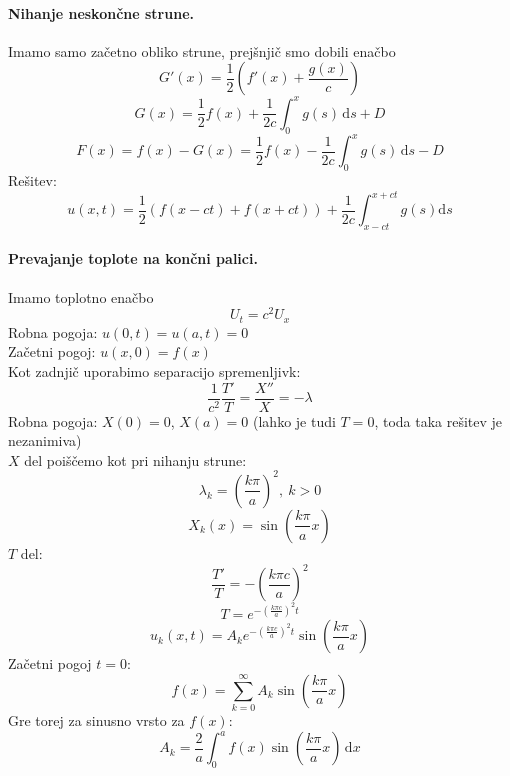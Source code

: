 \documentclass[a4paper]{article}
\newcommand{\dif}{\mathrm{d}}
\newcommand{\Sum}[2][0]{\sum_{{#2} = {#1}}^{\infty}}
\begin{document}
\paragraph{Nihanje neskončne strune.} Imamo samo začetno obliko strune, prejšnjič smo dobili enačbo
$$G'(x) = \frac{1}{2}(f'(x) + \frac{g(x)}{c})$$
$$G(x) = \frac{1}{2}f(x) + \frac{1}{2c} \int_{0}^{x}g(s)\,\dif s + D$$
$$F(x) = f(x) - G(x) = \frac{1}{2}f(x) - \frac{1}{2c} \int_{0}^{x} g(s)\,\dif s - D$$
Rešitev:
$$u(x, t) = \frac{1}{2}\left(f(x - ct) + f(x + ct)\right) + \frac{1}{2c}\int_{x-ct}^{x+ct}g(s)\dif s$$
\paragraph{Prevajanje toplote na končni palici.} Imamo toplotno enačbo
$$U_t = c^2 U_x$$
Robna pogoja: $u(0, t) = u(a, t) = 0$ \\
Začetni pogoj: $u(x, 0) = f(x)$ \\
Kot zadnjič uporabimo separacijo spremenljivk:
$$\frac{1}{c^2} \frac{T'}{T} = \frac{X''}{X} = -\lambda$$
Robna pogoja: $X(0) = 0$, $X(a) = 0$ (lahko je tudi $T = 0$, toda taka rešitev je nezanimiva) \\
$X$ del poiščemo kot pri nihanju strune:
$$\lambda_k = \left(\frac{k\pi}{a}\right)^2,~k>0$$
$$X_k(x) = \sin\left(\frac{k\pi}{a}x\right)$$
$T$ del: $$\frac{T'}{T} = -\left(\frac{k\pi c}{a}\right)^2$$
$$T = e^{-\left(\frac{k\pi c}{a}\right)^2t}$$
$$u_k(x, t) = A_ke^{-\left(\frac{k\pi c}{a}\right)^2t}\sin\left(\frac{k\pi}{a}x\right)$$
Začetni pogoj $t=0$:
$$f(x) = \Sum{k}A_k\sin\left(\frac{k\pi}{a}x\right)$$
Gre torej za sinusno vrsto za $f(x)$:
$$A_k = \frac{2}{a}\int_{0}^{a} f(x) \sin\left(\frac{k\pi}{a}x\right)\,\dif x$$
\end{document}
